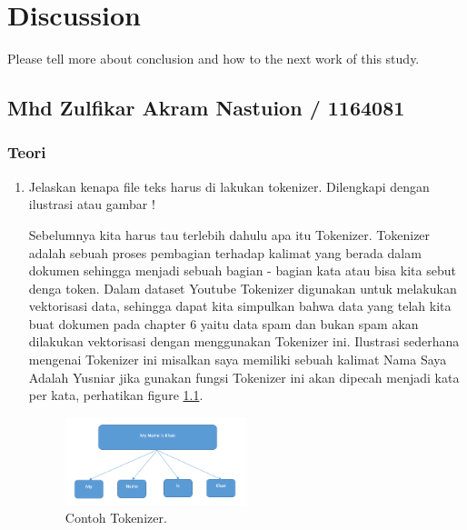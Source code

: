 \chapter{Discussion}
Please tell more about conclusion and how to the next work of this study.
\section{Mhd Zulfikar Akram Nastuion / 1164081}
\subsection{Teori}
\begin{enumerate}

\item Jelaskan kenapa file teks harus di lakukan tokenizer. Dilengkapi dengan ilustrasi atau gambar !
\par
Sebelumnya kita harus tau terlebih dahulu apa itu Tokenizer. Tokenizer adalah sebuah proses pembagian terhadap kalimat yang berada dalam dokumen sehingga menjadi sebuah bagian - bagian kata atau bisa kita sebut denga token. Dalam dataset Youtube Tokenizer digunakan untuk melakukan vektorisasi data, sehingga dapat kita simpulkan bahwa data yang telah kita buat dokumen pada chapter 6 yaitu data spam dan bukan spam akan dilakukan vektorisasi dengan menggunakan Tokenizer ini. Ilustrasi sederhana mengenai Tokenizer ini misalkan saya memiliki sebuah kalimat Nama Saya Adalah Yusniar jika gunakan fungsi Tokenizer ini akan dipecah menjadi kata per kata, perhatikan figure \ref{1}.

	\begin{figure}[!htbp!]
		\centerline{\includegraphics[width=0.5\textwidth]{figures/zulfikar/7/Teori/1164081_1.png}}
		\caption{Contoh Tokenizer.}
		\label{1}
	\end{figure}
\end{enumerate}